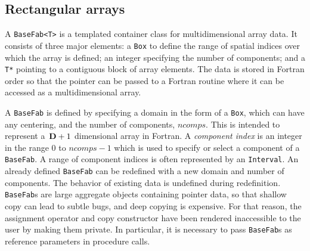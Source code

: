\subsection{Rectangular arrays}
\label{sec:basefab}

A \verb|BaseFab<T>| is a templated container class for multidimensional
array data. It consists of three major elements: a {\tt Box} to define 
the range of spatial indices over which the array is defined; an integer
specifying the number of components; and a {\tt T*}
pointing to a contiguous block of array elements. The data is stored in
Fortran order so that the pointer can be passed to a Fortran
routine where it can be accessed as a multidimensional array.

A \verb|BaseFab| is defined by specifying a domain in the form of a
\verb|Box|, which can have any centering, and the number of components,
$ncomps$.
This is intended to represent a~${\mathbf{D}}+1$ dimensional
array in Fortran.
A {\em component index} is an integer in the range $0$ to $ncomps - 1$
which is used to specify or select a component of a \verb/BaseFab/.
A range of component indices is often represented by an \verb/Interval/.
An already defined \verb|BaseFab| can be redefined
with a new domain and number of components.  The behavior of existing
data is undefined during redefinition. {\tt BaseFab}s are large
aggregate objects containing pointer data, so that shallow copy can lead
to subtle bugs, and deep copying is expensive. For that reason,
the assignment operator and copy constructor have been rendered 
inaccessible to the user by making them private. In particular, it is
necessary to pass {\tt BaseFab}s as reference parameters in procedure
calls.


